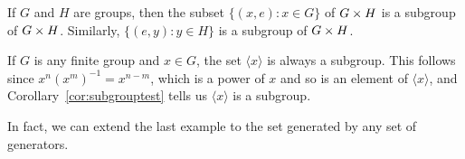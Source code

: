 \begin{example}
  If $G$ and $H$ are groups, then the subset $\{(x, e): x \in G\}$ of $G \times H$
  is a subgroup of $G \times H$.  Similarly, $\{(e, y): y \in H\}$ is a
  subgroup of $G \times H$.
\end{example}

\begin{example}
  If $G$ is any finite group and $x \in G$, the set $\langle x \rangle$ is
  always a subgroup.  This follows since $x^{n}(x^{m})^{-1} = x^{n-m}$, which
  is a power of $x$ and so is an element of $\langle x \rangle$, and
  Corollary~\ref{cor:subgrouptest} tells us $\langle x \rangle$ is a subgroup.
\end{example}

In fact, we can extend the last example to the set generated by any set of
generators.


